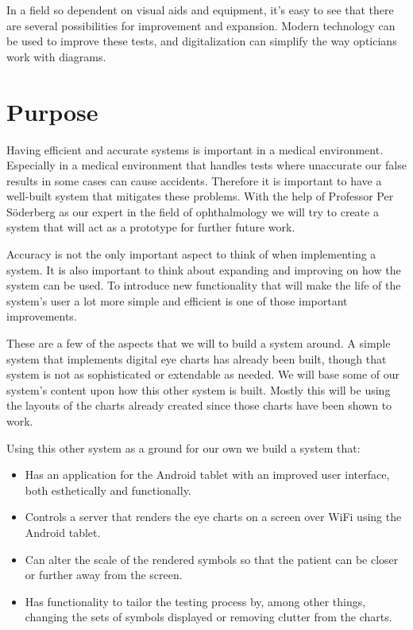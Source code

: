\documentclass[12pt,a4paper,notitlepage]{report}
\begin{document}
In a field so dependent on visual aids and equipment, it's easy to see that there are several possibilities for improvement and expansion. Modern technology can be used to improve these tests, and digitalization can simplify the way opticians work with diagrams.



\section{Purpose}
Having efficient and accurate systems is important in a medical environment. Especially in a medical environment that handles tests where unaccurate our false results in some cases can cause accidents. Therefore it is important to have a well-built system that mitigates these problems. With the help of Professor Per Söderberg as our expert in the field of ophthalmology we will try to create a system that will act as a prototype for further future work. 

Accuracy is not the only important aspect to think of when implementing a system. It is also important to think about expanding and improving on how the system can be used. To introduce new functionality that will make the life of the system's user a lot more simple and efficient is one of those important improvements. 

These are a few of the aspects that we will to build a system around. A simple system that implements digital eye charts has already been built, though that system is not as sophisticated or extendable as needed. We will base some of our system's content upon how this other system is built. Mostly this will be using the layouts of the charts already created since those charts have been shown to work. 

Using this other system as a ground for our own we build a system that:

\begin{itemize}
	\item Has an application for the Android tablet with an improved user interface, both esthetically and functionally.
	\item Controls a server that renders the eye charts on a screen over WiFi using the Android tablet.
	\item Can alter the scale of the rendered symbols so that the patient can be closer or further away from the screen.
	\item Has functionality to tailor the testing process by, among other things, changing the sets of symbols displayed or removing clutter from the charts.
\end{itemize}
\end{document}
